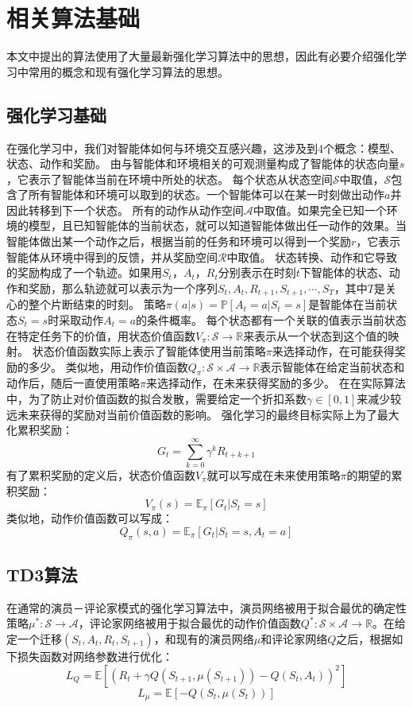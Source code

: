 \chapter{相关算法基础}
   本文中提出的算法使用了大量最新强化学习算法中的思想，因此有必要介绍强化学习中常用的概念和现有强化学习算法的思想。

    \section{强化学习基础}
    在强化学习中，我们对智能体如何与环境交互感兴趣，这涉及到4个概念：模型、状态、动作和奖励\cite{sutton1988reinforcement}。
    由与智能体和环境相关的可观测量构成了智能体的状态向量$s$，它表示了智能体当前在环境中所处的状态。
    每个状态从状态空间$\mathcal S$中取值，$\mathcal S$包含了所有智能体和环境可以取到的状态。一个智能体可以在某一时刻做出动作$a$并因此转移到下一个状态。
    所有的动作从动作空间$\mathcal A$中取值。如果完全已知一个环境的模型，且已知智能体的当前状态，就可以知道智能体做出任一动作的效果。当智能体做出某一个动作之后，根据当前的任务和环境可以得到一个奖励$r$，它表示智能体从环境中得到的反馈，并从奖励空间$\mathcal R$中取值。
    状态转换、动作和它导致的奖励构成了一个轨迹。如果用$S_t$，$A_t$，$R_t$分别表示在时刻$t$下智能体的状态、动作和奖励，那么轨迹就可以表示为一个序列$S_t,A_t,R_{t+1},S_{t+1},\cdots,S_T$，其中$T$是关心的整个片断结束的时刻。
    策略$\pi(a|s)=\mathbb P[A_t=a|S_t=s]$是智能体在当前状态$S_t=s$时采取动作$A_t=a$的条件概率。
    每个状态都有一个关联的值表示当前状态在特定任务下的价值，用状态价值函数$V_\pi:\mathcal S\to\mathbb R$来表示从一个状态到这个值的映射。
    状态价值函数实际上表示了智能体使用当前策略$\pi$来选择动作，在可能获得奖励的多少。
    类似地，用动作价值函数$Q_\pi:\mathcal S\times\mathcal A\to\mathbb R$表示智能体在给定当前状态和动作后，随后一直使用策略$\pi$来选择动作，在未来获得奖励的多少。
    在在实际算法中，为了防止对价值函数的拟合发散，需要给定一个折扣系数$\gamma\in[0,1]$来减少较远未来获得的奖励对当前价值函数的影响。
    强化学习的最终目标实际上为了最大化累积奖励：
    $$G_t=\sum_{k=0}^\infty \gamma^k R_{t+k+1}$$
    有了累积奖励的定义后，状态价值函数$V_\pi$就可以写成在未来使用策略$\pi$的期望的累积奖励：
    $$V_\pi(s)=\mathbb E_\pi[G_t|S_t=s]$$
    类似地，动作价值函数可以写成：
    $$Q_\pi(s,a)=\mathbb E_\pi[G_t|S_t=s,A_t=a]$$

    \section{TD3算法}
    在通常的演员－评论家模式的强化学习算法中\cite{konda2002actor}，演员网络被用于拟合最优的确定性策略$\mu^*:\mathcal S\to\mathcal A$，评论家网络被用于拟合最优的动作价值函数$Q^*:\mathcal S\times \mathcal A\to \mathbb R$。在给定一个迁移$(S_t,A_t,R_t,S_{t+1})$，和现有的演员网络$\mu$和评论家网络$Q$之后，根据如下损失函数对网络参数进行优化：
    $$L_Q = \mathbb E[(R_t + \gamma Q(S_{t+1},\mu(S_{t+1})) - Q(S_t, A_t))^2]$$
    $$L_\mu = \mathbb E[-Q(S_t, \mu(S_t))]$$

